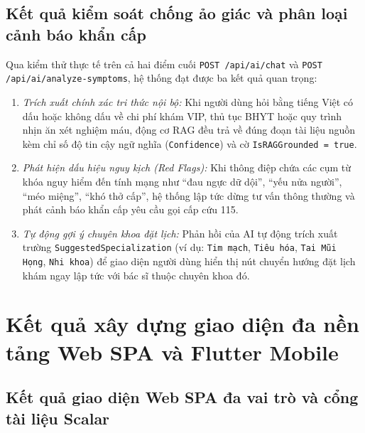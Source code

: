 \subsection{Kết quả kiểm soát chống ảo giác và phân loại cảnh báo khẩn cấp}

Qua kiểm thử thực tế trên cả hai điểm cuối \texttt{POST /api/ai/chat} và \texttt{POST /api/ai/analyze-symptoms}, hệ thống đạt được ba kết quả quan trọng:
\begin{enumerate}
    \item \textit{Trích xuất chính xác tri thức nội bộ:} Khi người dùng hỏi bằng tiếng Việt có dấu hoặc không dấu về chi phí khám VIP, thủ tục BHYT hoặc quy trình nhịn ăn xét nghiệm máu, động cơ RAG đều trả về đúng đoạn tài liệu nguồn kèm chỉ số độ tin cậy ngữ nghĩa (\texttt{Confidence}) và cờ \texttt{IsRAGGrounded = true}.
    \item \textit{Phát hiện dấu hiệu nguy kịch (Red Flags):} Khi thông điệp chứa các cụm từ khóa nguy hiểm đến tính mạng như ``đau ngực dữ dội'', ``yếu nửa người'', ``méo miệng'', ``khó thở cấp'', hệ thống lập tức dừng tư vấn thông thường và phát cảnh báo khẩn cấp yêu cầu gọi cấp cứu 115.
    \item \textit{Tự động gợi ý chuyên khoa đặt lịch:} Phản hồi của AI tự động trích xuất trường \texttt{SuggestedSpecialization} (ví dụ: \texttt{Tim mạch}, \texttt{Tiêu hóa}, \texttt{Tai Mũi Họng}, \texttt{Nhi khoa}) để giao diện người dùng hiển thị nút chuyển hướng đặt lịch khám ngay lập tức với bác sĩ thuộc chuyên khoa đó.
\end{enumerate}

\section{Kết quả xây dựng giao diện đa nền tảng Web SPA và Flutter Mobile}

\subsection{Kết quả giao diện Web SPA đa vai trò và cổng tài liệu Scalar}

